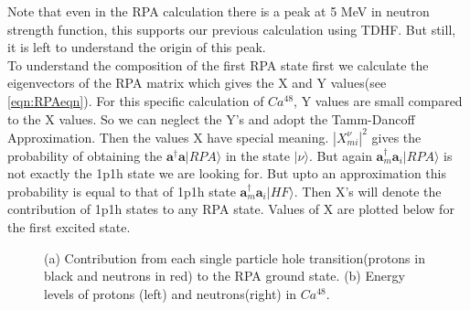 \documentclass[a4paper]{paper}
\begin{document}
                Note that even in the RPA calculation there is a peak at 5 MeV in neutron strength function, this supports our previous calculation using TDHF. But still, it is left to understand the origin of this peak. \\
                To understand the composition of the first RPA state first we calculate the eigenvectors of the RPA matrix which gives the X and Y values(see \ref{eqn:RPAeqn}). For this specific calculation of $Ca^{48}$, Y values are small compared to the X values. So we can neglect the Y's and adopt the Tamm-Dancoff Approximation. Then the values X have special meaning. $|X_{mi}^{\nu}|^2$ gives the probability of obtaining the $\mathbf{a}^{\dagger}\mathbf{a}|RPA\rangle$ in the state $|\nu\rangle$. But again $\mathbf{a}^{\dagger}_{m}\mathbf{a}_{i}|RPA\rangle$ is not exactly the 1p1h state we are looking for. But upto an approximation this probability is equal to that of 1p1h state $\mathbf{a}^{\dagger}_{m}\mathbf{a}_{i}|HF\rangle$. Then X's will denote the contribution of 1p1h states to any RPA state. Values of X are plotted below for the first excited state.
                \begin{figure}[H]
                \centering
                    \caption{(a) Contribution from each single particle hole transition(protons in black and neutrons in red) to the RPA ground state. (b) Energy levels of protons (left) and neutrons(right) in $Ca^{48}$.}
                \end{figure}
\end{document}
